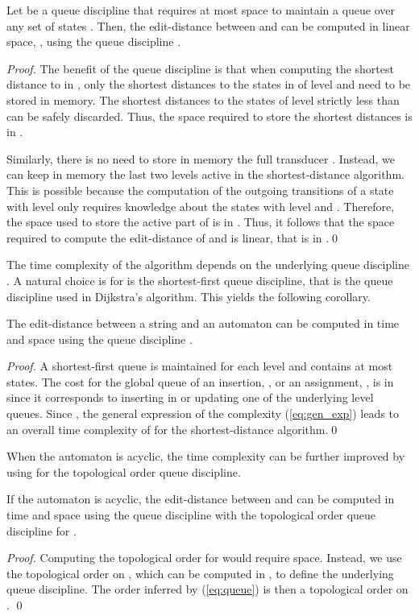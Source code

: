 \documentclass{llncs}
\newcommand{\0}{\overline{0}}
\newcommand{\1}{\overline{1}}
\newcommand{\+}{\oplus}
\renewcommand{\.}{\otimes}
\begin{document}
\begin{proposition}
\label{prop:algo}
Let  be a queue discipline that requires at most  space
to maintain a queue over any set of states . Then, the
edit-distance between  and  can be computed in linear space,
, using the queue discipline .
\end{proposition}
\begin{proof}
  The benefit of the queue discipline  is that when computing
  the shortest distance to  in , only the shortest
  distances to the states in  of level  and  need to be
  stored in memory. The shortest distances to the states of level
  strictly less than  can be safely discarded. Thus, the space
  required to store the shortest distances is in .
 
  Similarly, there is no need to store in memory the full transducer
  . Instead, we can keep in memory the last two levels active in
  the shortest-distance algorithm. This is possible because the
  computation of the outgoing transitions of a state with level 
  only requires knowledge about the states with level  and . Therefore, the space used to store the active part of  is in
  .  Thus, it follows that the space
  required to compute the edit-distance of  and  is linear, that
  is in .\qed
\end{proof}

The time complexity of the algorithm depends on the underlying queue
discipline .  A natural choice is for  is the
shortest-first queue discipline, that is the queue discipline used in
Dijkstra's algorithm. This yields the following corollary.
\begin{corollary}
\label{cor:cyclic}
The edit-distance between a string  and an automaton  can be
computed in time  and space 
using the queue discipline .
\end{corollary}
\begin{proof}
  A shortest-first queue is maintained for each level and contains at
  most  states. The cost for the global queue of an insertion,
  , or an assignment, , is in  since it corresponds to inserting in or updating one of the
  underlying level queues. Since , the general
  expression of the complexity (\ref{eq:gen_exp}) leads to an overall
  time complexity of  for the shortest-distance
  algorithm.\qed
\end{proof}

When the automaton  is acyclic, the time complexity can be further
improved by using for  the topological order queue discipline.
\begin{corollary}
\label{cor:acyclic}
If the automaton  is acyclic, the edit-distance between  and 
can be computed in time  and space  using
the queue discipline  with the topological order queue
discipline for .
\end{corollary}
\begin{proof}
  Computing the topological order for  would require 
  space.  Instead, we use the topological order on , which can be
  computed in , to define the underlying queue discipline.
  The order inferred by (\ref{eq:queue}) is then a topological order
  on .  \qed
\end{proof}
\end{document}

